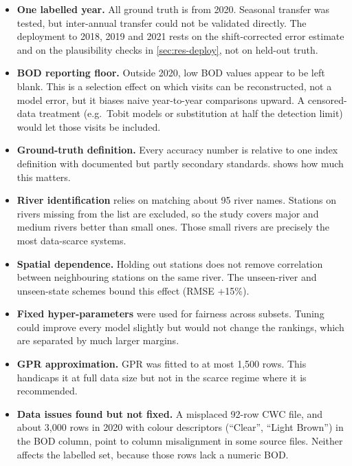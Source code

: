 \begin{itemize}
  \item \textbf{One labelled year.} All ground truth is from 2020. Seasonal transfer was tested, but inter-annual transfer could not be validated directly. The deployment to 2018, 2019 and 2021 rests on the shift-corrected error estimate and on the plausibility checks in \cref{sec:res-deploy}, not on held-out truth.
  \item \textbf{BOD reporting floor.} Outside 2020, low BOD values appear to be left blank. This is a selection effect on which visits can be reconstructed, not a model error, but it biases naive year-to-year comparisons upward. A censored-data treatment (e.g.\ Tobit models or substitution at half the detection limit) would let those visits be included.
  \item \textbf{Ground-truth definition.} Every accuracy number is relative to one index definition with documented but partly secondary standards.  shows how much this matters.
  \item \textbf{River identification} relies on matching about 95 river names. Stations on rivers missing from the list are excluded, so the study covers major and medium rivers better than small ones. Those small rivers are precisely the most data-scarce systems.
  \item \textbf{Spatial dependence.} Holding out stations does not remove correlation between neighbouring stations on the same river. The unseen-river and unseen-state schemes bound this effect (RMSE +15\%).
  \item \textbf{Fixed hyper-parameters} were used for fairness across subsets. Tuning could improve every model slightly but would not change the rankings, which are separated by much larger margins.
  \item \textbf{GPR approximation.} GPR was fitted to at most 1,500 rows. This handicaps it at full data size but not in the scarce regime where it is recommended.
  \item \textbf{Data issues found but not fixed.} A misplaced 92-row CWC file, and about 3,000 rows in 2020 with colour descriptors (``Clear'', ``Light Brown'') in the BOD column, point to column misalignment in some source files. Neither affects the labelled set, because those rows lack a numeric BOD.
\end{itemize}
